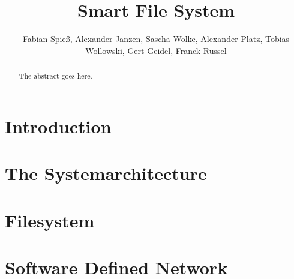 \documentclass[journal]{IEEEtran}
\begin{document}
\title{Smart File System}



\author{Fabian Spie\ss, Alexander Janzen, Sascha Wolke, Alexander Platz, Tobias Wollowski, Gert Geidel, Franck Russel}


\maketitle





\begin{abstract}


The abstract goes here.

\end{abstract}



\IEEEpeerreviewmaketitle







\section{Introduction}



\section{The Systemarchitecture}







\section{Filesystem}





\section{Software Defined Network}


\end{document}

